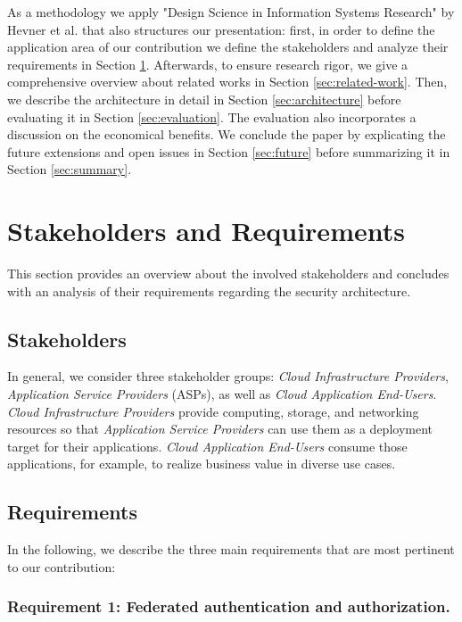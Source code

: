 \documentclass{llncs}
\begin{document}
As a methodology we apply "Design Science in Information Systems Research" by Hevner et al. \cite{HMPR04} that also structures our presentation: first, in order to define the application area of our contribution we define the stakeholders and analyze their requirements in Section \ref{sec:requirements}. Afterwards, to ensure research rigor, we give a comprehensive overview about related works in Section \ref{sec:related-work}. Then, we describe the architecture in detail in Section \ref{sec:architecture} before evaluating it in Section \ref{sec:evaluation}. The evaluation also incorporates a discussion on the economical benefits. We conclude the paper by explicating the future extensions and open issues in Section \ref{sec:future} before summarizing it in Section \ref{sec:summary}.

\section{Stakeholders and Requirements}
\label{sec:requirements}

This section provides an overview about the involved stakeholders and concludes with an analysis of their requirements regarding the security architecture.

\subsection{Stakeholders}

In general, we consider three stakeholder groups: \textit{Cloud Infrastructure Providers}, \textit{Application Service Providers} (ASPs), as well as \textit{Cloud Application End-Users}. \textit{Cloud Infrastructure Providers} provide computing, storage, and networking resources so that \textit{Application Service Providers} can use them as a deployment target for their applications. \textit{Cloud Application End-Users} consume those applications, for example, to realize business value in diverse use cases.

\subsection{Requirements}

In the following, we describe the three main requirements that are most pertinent to our contribution:

\subsubsection{Requirement 1: Federated authentication and authorization.}
\end{document}
